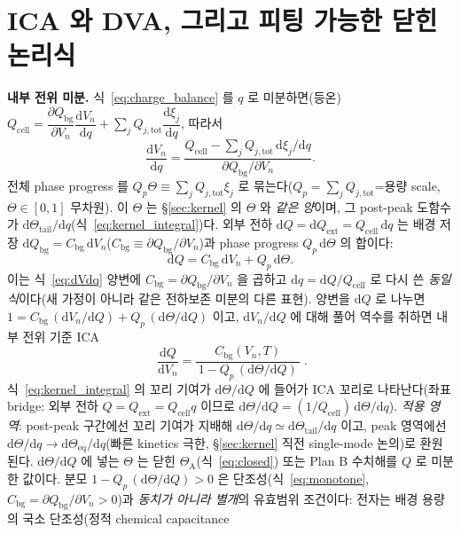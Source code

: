 \documentclass[11pt,a4paper]{article}
\newcommand{\dd}{\mathrm{d}}
\newcommand{\eq}{\mathrm{eq}}
\newcommand{\bg}{\mathrm{bg}}
\newcommand{\cell}{\mathrm{cell}}
\newcommand{\ext}{\mathrm{ext}}
\newcommand{\tot}{\mathrm{tot}}
\begin{document}
\section{ICA 와 DVA, 그리고 피팅 가능한 닫힌 논리식}\label{sec:fiteq}
\textbf{내부 전위 미분.} 식~\eqref{eq:charge_balance} 를 $q$ 로 미분하면(등온)
$Q_\cell=\dfrac{\partial Q_\bg}{\partial V_n}\dfrac{\dd V_n}{\dd q}+\sum_j Q_{j,\tot}\dfrac{\dd\xi_j}{\dd q}$,
따라서
\begin{equation}
\frac{\dd V_n}{\dd q}=\frac{Q_\cell-\sum_j Q_{j,\tot}\,\dd\xi_j/\dd q}{\partial Q_\bg/\partial V_n}.
\label{eq:dVdq}
\end{equation}
전체 phase progress 를 $Q_p\Theta\equiv\sum_j Q_{j,\tot}\xi_j$ 로 묶는다($Q_p=\sum_j Q_{j,\tot}$=용량 scale,
$\Theta\in[0,1]$ 무차원). 이 $\Theta$ 는 \S\ref{sec:kernel} 의 $\Theta$ 와 \emph{같은 양}이며, 그 post-peak
도함수가 $\dd\Theta_\mathrm{tail}/\dd q$(식~\eqref{eq:kernel_integral})다. 외부 전하 $\dd Q=\dd Q_\ext=
Q_\cell\,\dd q$ 는 배경 저장 $\dd Q_\bg=C_\bg\,\dd V_n$($C_\bg\equiv\partial Q_\bg/\partial V_n$)과
phase progress $Q_p\,\dd\Theta$ 의 합이다:
\begin{equation}
\dd Q=C_\bg\,\dd V_n+Q_p\,\dd\Theta.
\label{eq:dQsplit}
\end{equation}
이는 식~\eqref{eq:dVdq} 양변에 $C_\bg=\partial Q_\bg/\partial V_n$ 을 곱하고 $\dd q=\dd Q/Q_\cell$ 로 다시 쓴
\emph{동일식}이다(새 가정이 아니라 같은 전하보존 미분의 다른 표현). 양변을 $\dd Q$ 로 나누면 $1=C_\bg\,(\dd V_n/\dd Q)+Q_p\,(\dd\Theta/\dd Q)$ 이고, $\dd V_n/\dd Q$ 에 대해 풀어
역수를 취하면 내부 전위 기준 ICA
\begin{equation}
\boxed{\;\frac{\dd Q}{\dd V_n}=\frac{C_\bg(V_n,T)}{\,1-Q_p\,(\dd\Theta/\dd Q)\,}\;.}
\label{eq:fiteq}
\end{equation}
식~\eqref{eq:kernel_integral} 의 꼬리 기여가 $\dd\Theta/\dd Q$ 에 들어가 ICA 꼬리로 나타난다(좌표 bridge:
외부 전하 $Q=Q_\ext=Q_\cell q$ 이므로 $\dd\Theta/\dd Q=(1/Q_\cell)\,\dd\Theta/\dd q$). \emph{적용 영역}: post-peak
구간에선 꼬리 기여가 지배해 $\dd\Theta/\dd q\simeq\dd\Theta_\mathrm{tail}/\dd q$ 이고, peak 영역에선
$\dd\Theta/\dd q\to\dd\Theta_\eq/\dd q$(빠른 kinetics 극한, \S\ref{sec:kernel} 직전 single-mode 논의)로 환원된다.
$\dd\Theta/\dd Q$ 에 넣는 $\Theta$ 는 닫힌 $\Theta_\mathrm A$(식~\eqref{eq:closed}) 또는 Plan B 수치해를 $Q$ 로
미분한 값이다. 분모
$1-Q_p\,(\dd\Theta/\dd Q)>0$ 은 단조성(식~\eqref{eq:monotone}, $C_\bg=\partial Q_\bg/\partial V_n>0$)과
\emph{동치가 아니라 별개}의 유효범위 조건이다: 전자는 배경 용량의 국소 단조성(정적 chemical capacitance
\end{document}
